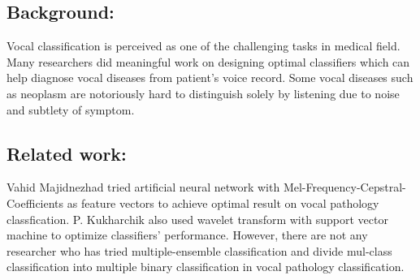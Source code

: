 \subsection{Background:}
	Vocal classification is perceived as one of the challenging tasks in medical field. Many researchers did meaningful work on designing optimal classifiers which can help diagnose vocal diseases from patient's voice record. Some vocal diseases such as neoplasm are notoriously hard to distinguish solely by listening due to noise and subtlety of symptom. 
\subsection{Related work:}
	Vahid Majidnezhad tried artificial neural network with Mel-Frequency-Cepstral-Coefficients as feature vectors to achieve optimal result on vocal pathology classfication\cite{b5}. P. Kukharchik also used wavelet transform with support vector machine to optimize classifiers' performance\cite{b4}. However, there are not any researcher who has tried multiple-ensemble classification and divide mul-class classification into multiple binary classification in vocal pathology classification.
	